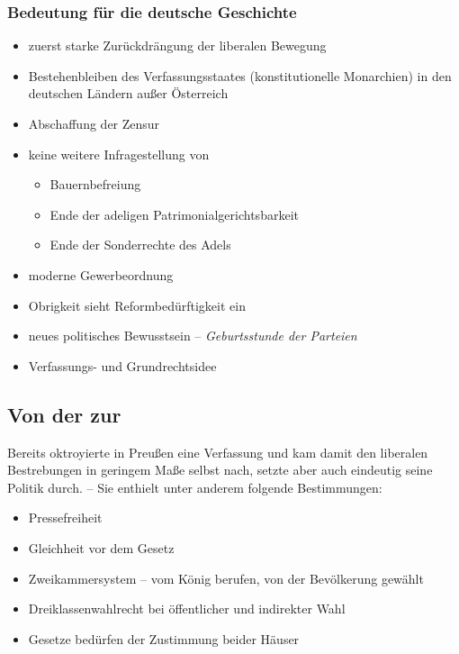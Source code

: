 \subsubsection[Bedeutung für die deutsche Geschichte]{Bedeutung für
die deutsche Geschichte}

\begin{itemize}
\item zuerst starke Zurückdrängung der liberalen Bewegung
\item Bestehenbleiben des Verfassungsstaates (konstitutionelle
Monarchien) in den deutschen Ländern außer Österreich
\item Abschaffung der Zensur

\item keine weitere Infragestellung von
\begin{itemize}
\item Bauernbefreiung
\item Ende der adeligen Patrimonialgerichtsbarkeit
\item Ende der Sonderrechte des Adels
\end{itemize}

\item moderne Gewerbeordnung
\item Obrigkeit sieht Reformbedürftigkeit ein
\item neues politisches Bewusstsein -- \emph{Geburtsstunde der Parteien}
\item Verfassungs- und Grundrechtsidee
\end{itemize}


\subsection{Von der  zur }

Bereits  oktroyierte  in
Preußen eine Verfassung und kam damit den liberalen Bestrebungen in
geringem Maße selbst nach, setzte aber auch eindeutig seine Politik
durch. -- Sie enthielt unter anderem folgende Bestimmungen:

\begin{itemize}
\item Pressefreiheit
\item Gleichheit vor dem Gesetz
\item Zweikammersystem --  vom
König berufen,  von
der Bevölkerung gewählt
\item Dreiklassenwahlrecht  bei
öffentlicher und indirekter Wahl
\item Gesetze bedürfen der Zustimmung beider Häuser
\end{itemize}

